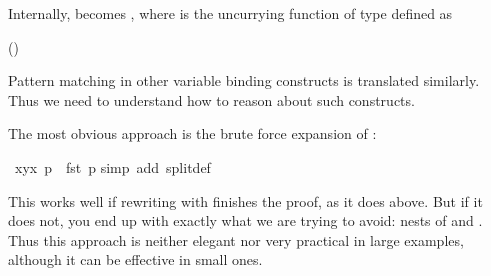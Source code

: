 \begin{isabellebody}
\begin{isamarkuptext}
Internally,  becomes , where
 is the uncurrying function of type  defined as
\begin{center}
\hfill()
\end{center}
Pattern matching in
other variable binding constructs is translated similarly. Thus we need to
understand how to reason about such constructs.%
\end{isamarkuptext}%
\isamarkuptrue%
%
\isamarkuptrue%
%
\begin{isamarkuptext}%
The most obvious approach is the brute force expansion of :%
\end{isamarkuptext}%
\isamarkuptrue%
\isamarkupfalse%
\ {\isachardoublequoteopen}{\isacharparenleft}{\isasymlambda}{\isacharparenleft}x{\isacharcomma}y{\isacharparenright}{\isachardot}x{\isacharparenright}\ p\ {\isacharequal}\ fst\ p{\isachardoublequoteclose}\isanewline
%
\isadelimproof
%
\endisadelimproof
%
\isatagproof
{}\isamarkupfalse%
{\isacharparenleft}simp\ add{\isacharcolon}\ split{\isacharunderscore}def{\isacharparenright}%
\endisatagproof
{\isafoldproof}%
%
\isadelimproof
%
\endisadelimproof
%
\begin{isamarkuptext}%
\noindent
This works well if rewriting with  finishes the
proof, as it does above.  But if it does not, you end up with exactly what
we are trying to avoid: nests of  and . Thus this
approach is neither elegant nor very practical in large examples, although it
can be effective in small ones.


\end{isamarkuptext}
\end{isabellebody}
